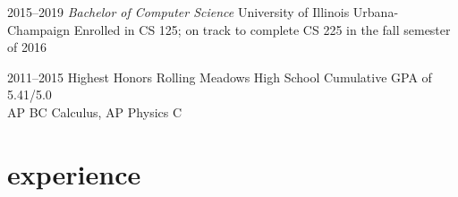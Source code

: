 \documentclass[]{resume} %
\begin{document}
\begin{entrylist}


\entry
{2015--2019}
{{\normalfont \emph{Bachelor of Computer Science}}}
{University of Illinois Urbana-Champaign}
{Enrolled in CS 125; on track to complete CS 225 in the fall semester of 2016}


\entry
{2011--2015}
{ {\normalfont Highest Honors}}
{Rolling Meadows High School}
{Cumulative GPA of 5.41/5.0 \\
AP BC Calculus, AP Physics C}


\end{entrylist}


\section{experience}

\end{document}
